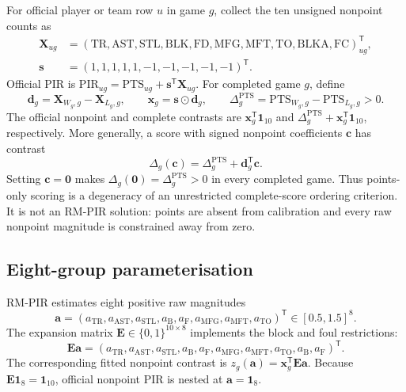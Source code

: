 \documentclass[pdflatex,sn-mathphys-num]{sn-jnl}
\newcommand{\pir}{\mathrm{PIR}}
\begin{document}
For official player or team row \(u\) in game \(g\), collect the ten unsigned nonpoint counts as
\begin{equation}
\begin{aligned}
\mathbf X_{ug}&=(\mathrm{TR},\mathrm{AST},\mathrm{STL},\mathrm{BLK},\mathrm{FD},
\mathrm{MFG},\mathrm{MFT},\mathrm{TO},\mathrm{BLKA},\mathrm{FC})_{ug}^{\mathsf T},\\
\mathbf s&=(1,1,1,1,1,-1,-1,-1,-1,-1)^{\mathsf T}.
\end{aligned}
\label{eq:s-components}
\end{equation}
Official PIR is \(\pir_{ug}=\mathrm{PTS}_{ug}+\mathbf s^{\mathsf T}\mathbf X_{ug}\). For completed game \(g\), define
\begin{equation}
\mathbf d_g=\mathbf X_{W_g,g}-\mathbf X_{L_g,g},
\qquad
\mathbf x_g=\mathbf s\odot\mathbf d_g,
\qquad
\Delta_g^{\mathrm{PTS}}=\mathrm{PTS}_{W_g,g}-\mathrm{PTS}_{L_g,g}>0.
\label{eq:s-design}
\end{equation}
The official nonpoint and complete contrasts are \(\mathbf x_g^{\mathsf T}\mathbf1_{10}\) and \(\Delta_g^{\mathrm{PTS}}+\mathbf x_g^{\mathsf T}\mathbf1_{10}\), respectively. More generally, a score with signed nonpoint coefficients \(\mathbf c\) has contrast
\begin{equation}
\Delta_g(\mathbf c)=\Delta_g^{\mathrm{PTS}}+\mathbf d_g^{\mathsf T}\mathbf c.
\label{eq:s-general}
\end{equation}
Setting \(\mathbf c=\mathbf0\) makes \(\Delta_g(\mathbf0)=\Delta_g^{\mathrm{PTS}}>0\) in every completed game. Thus points-only scoring is a degeneracy of an unrestricted complete-score ordering criterion. It is not an RM-PIR solution: points are absent from calibration and every raw nonpoint magnitude is constrained away from zero.

\subsection{Eight-group parameterisation}

RM-PIR estimates eight positive raw magnitudes
\begin{equation}
\mathbf a=(a_{\mathrm{TR}},a_{\mathrm{AST}},a_{\mathrm{STL}},a_{\mathrm B},a_{\mathrm F},
a_{\mathrm{MFG}},a_{\mathrm{MFT}},a_{\mathrm{TO}})^{\mathsf T}\in[0.5,1.5]^8.
\label{eq:s-raw}
\end{equation}
The expansion matrix \(\mathbf E\in\{0,1\}^{10\times8}\) implements the block and foul restrictions:
\begin{equation}
\mathbf E\mathbf a=(a_{\mathrm{TR}},a_{\mathrm{AST}},a_{\mathrm{STL}},a_{\mathrm B},a_{\mathrm F},
a_{\mathrm{MFG}},a_{\mathrm{MFT}},a_{\mathrm{TO}},a_{\mathrm B},a_{\mathrm F})^{\mathsf T}.
\label{eq:s-expansion}
\end{equation}
The corresponding fitted nonpoint contrast is \(z_g(\mathbf a)=\mathbf x_g^{\mathsf T}\mathbf E\mathbf a\). Because \(\mathbf E\mathbf1_8=\mathbf1_{10}\), official nonpoint PIR is nested at \(\mathbf a=\mathbf1_8\).
\end{document}

